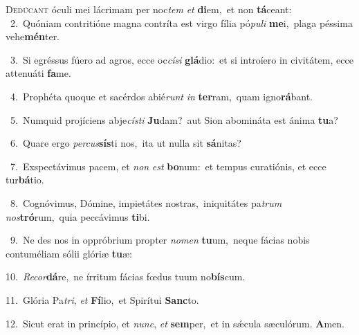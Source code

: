 \lettrine{\initial\textcolor{\initialcolor}{D}}{edúcant} óculi mei lácrimam per noc\textit{tem} \textit{et} \textbf{di}\-em,~\star et non \textbf{tá}\-ceant:\\
{\numbfont\textcolor{\numbcolor}{~2.}}~Quóniam contritióne magna contríta est virgo fília pó\-\textit{pu}\-\textit{li} \textbf{me}\-i,~\star plaga péssima vehe\-\textbf{mén}\-ter.\par
{\numbfont\textcolor{\numbcolor}{~3.}}~Si egréssus fúero ad agros, ecce oc\-\textit{cí}\-\textit{si} \textbf{glá}\-dio:~\star et si introíero in civitátem, ecce attenuáti \textbf{fa}\-me.\par
{\numbfont\textcolor{\numbcolor}{~4.}}~Prophéta quoque et sacérdos abié\textit{runt} \textit{in} \textbf{ter}\-ram,~\star quam igno\-\textbf{rá}\-bant.\par
{\numbfont\textcolor{\numbcolor}{~5.}}~Numquid projíciens abje\-\textit{cís}\-\textit{ti} \textbf{Ju}\-dam?~\star aut Sion abomináta est ánima \textbf{tu}\-a?\par
{\numbfont\textcolor{\numbcolor}{~6.}}~Quare ergo \textit{per}\-\textit{cus}\textbf{sís}ti nos,~\star ita ut nulla sit \textbf{sá}\-nitas?\par
{\numbfont\textcolor{\numbcolor}{~7.}}~Exspectávimus pacem, et \textit{non} \textit{est} \textbf{bo}\-num:~\star et tempus curatiónis, et ecce tur\-\textbf{bá}\-tio.\par
{\numbfont\textcolor{\numbcolor}{~8.}}~Cognóvimus, Dómine, impietátes nostras,~\dagger iniquitátes pa\textit{trum} \textit{nos}\-\textbf{tró}rum,~\star quia peccávimus \textbf{ti}\-bi.\par
{\numbfont\textcolor{\numbcolor}{~9.}}~Ne des nos in oppróbrium propter \textit{no}\-\textit{men} \textbf{tu}\-um,~\star neque fácias nobis contuméliam sólii glóriæ \textbf{tu}\-æ:\par
{\numbfont\textcolor{\numbcolor}{10.}}~\-\textit{Re}\-\textit{cor}\textbf{dá}re,~\star ne írritum fácias fœdus tuum no\-\textbf{bís}\-cum.\par
{\numbfont\textcolor{\numbcolor}{11.}}~Glória Pa\-\textit{tri}\-, \textit{et} \textbf{Fí}\-lio,~\star et Spirítui \textbf{Sanc}\-to.\par
{\numbfont\textcolor{\numbcolor}{12.}}~Sicut erat in princípio, et \textit{nunc}\-, \textit{et} \textbf{sem}\-per,~\star et in sǽcula sæculórum. \textbf{A}\-men.\par
